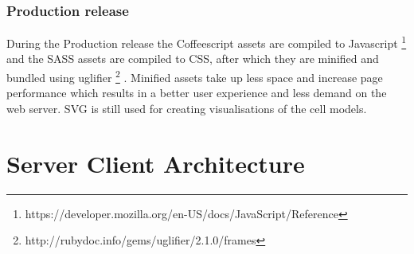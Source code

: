 \documentclass{report}
\begin{document}
			\subsubsection{Production release}
				During the Production release the Coffeescript assets are compiled to Javascript \footnote{https://developer.mozilla.org/en-US/docs/JavaScript/Reference} and the SASS assets are compiled to CSS, after which they are minified and bundled using uglifier \footnote{http://rubydoc.info/gems/uglifier/2.1.0/frames} . Minified assets take up less space and increase page performance which results in a better user experience and less demand on the web server. 
				SVG is still used for creating visualisations of the cell models.
		\newpage
				 
		\section{Server Client Architecture}
			
\end{document}
